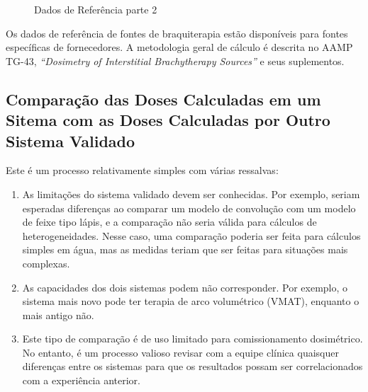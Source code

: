 \documentclass[11pt,a4paper]{article}
\newcounter{exemplo}
\begin{document}
	\begin{figure}[!h]
		\centering
		\caption{Dados de Referência parte 2}
		\label{fig:benchmarkdata2}
	\end{figure}


	Os dados de referência de fontes de braquiterapia estão disponíveis para fontes específicas de fornecedores. A metodologia geral de cálculo é descrita no AAMP TG-43, \textit{``Dosimetry of Interstitial Brachytherapy Sources''} e seus suplementos.

\subsection*{Comparação das Doses Calculadas em um Sitema com as Doses Calculadas por Outro Sistema Validado}

	Este é um processo relativamente simples com várias ressalvas:
	
	\begin{enumerate}[label=\textcolor{CarnationPink}{\arabic*${}^\circ $}]
		\item As limitações do sistema validado devem ser conhecidas. Por exemplo, seriam esperadas diferenças ao comparar um modelo de convolução com um modelo de feixe tipo lápis, e a comparação não seria válida para cálculos de heterogeneidades. Nesse caso, uma comparação poderia ser feita para cálculos simples em água, mas as medidas teriam que ser feitas para situações mais complexas.
		\item As capacidades dos dois sistemas podem não corresponder. Por exemplo, o sistema mais novo pode ter terapia de arco volumétrico (VMAT), enquanto o mais antigo não.
		\item Este tipo de comparação é de uso limitado para comissionamento dosimétrico. No entanto, é um processo valioso revisar com a equipe clínica quaisquer diferenças entre os sistemas para que os resultados possam ser correlacionados com a experiência anterior. 
	\end{enumerate}
	
\end{document}
